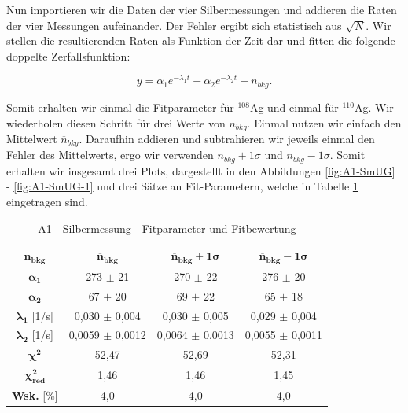 \documentclass{article}
\begin{document}
Nun importieren wir die Daten der vier Silbermessungen und addieren die Raten der vier Messungen aufeinander. Der Fehler ergibt sich statistisch aus $\sqrt{N}$. Wir stellen die resultierenden Raten als Funktion der Zeit dar und fitten die folgende doppelte Zerfallsfunktion:

\begin{equation}
    y = \alpha_1 e^{-\lambda_1 t} + \alpha_2 e^{-\lambda_2 t} + n_{bkg}.
\end{equation}

Somit erhalten wir einmal die Fitparameter für $^{108}$Ag und einmal für $^{110}$Ag. Wir wiederholen diesen Schritt für drei Werte von $n_{bkg}$. Einmal nutzen wir einfach den Mittelwert $\overline{n}_{bkg}$. Daraufhin addieren und subtrahieren wir jeweils einmal den Fehler des Mittelwerts, ergo wir verwenden $\overline{n}_{bkg} + 1\sigma$ und $\overline{n}_{bkg} - 1\sigma$. Somit erhalten wir insgesamt drei Plots, dargestellt in den Abbildungen \ref{fig:A1-SmUG} - \ref{fig:A1-SmUG-1} und drei Sätze an Fit-Parametern, welche in Tabelle \ref{tab:A1-Fits} eingetragen sind. 

\phantom{.}

\begin{table}[!h]
    \centering
    \begin{tabular}{c|ccc}
        \hline
        $\bm{n_{bkg}}$ & $\bm{\overline{n}_{bkg}}$ & $\bm{\overline{n}_{bkg} + 1\sigma}$ & $\bm{\overline{n}_{bkg} - 1\sigma}$ \\ \hline
        $\bm{\alpha_1}$ & 273 $\pm$ 21 & 270 $\pm$ 22 & 276 $\pm$ 20 \\
        $\bm{\alpha_2}$ & 67 $\pm$ 20 & 69 $\pm$ 22 & 65 $\pm$ 18 \\
        $\bm{\lambda_1}$ [1/s] & 0,030 $\pm$ 0,004 & 0,030 $\pm$ 0,005 & 0,029 $\pm$ 0,004 \\
        $\bm{\lambda_2}$ [1/s] & 0,0059 $\pm$ 0,0012 & 0,0064 $\pm$ 0,0013 & 0,0055 $\pm$ 0,0011 \\ \hline
        $\bm{\chi^2}$ & 52,47 & 52,69 & 52,31  \\
        $\bm{\chi^2_{red}}$ & 1,46 & 1,46 & 1,45  \\
        \textbf{Wsk.} [\%] & 4,0 & 4,0 & 4,0  \\ \hline
    \end{tabular}%
    \caption{A1 - Silbermessung - Fitparameter und Fitbewertung}
    \label{tab:A1-Fits}
\end{table}
\end{document}

